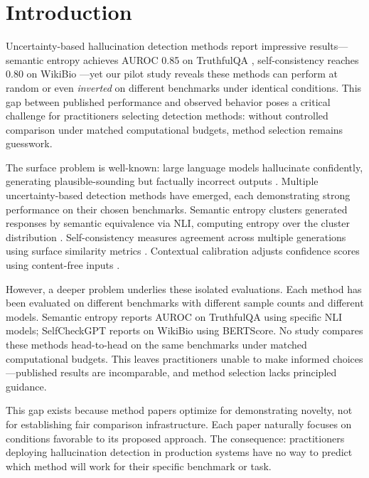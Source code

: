 \section{Introduction}
\label{sec:introduction}

Uncertainty-based hallucination detection methods report impressive results---semantic entropy achieves AUROC 0.85 on TruthfulQA \cite{kuhn2023semantic}, self-consistency reaches 0.80 on WikiBio \cite{manakul2023selfcheckgpt}---yet our pilot study reveals these methods can perform at random or even \emph{inverted} on different benchmarks under identical conditions. This gap between published performance and observed behavior poses a critical challenge for practitioners selecting detection methods: without controlled comparison under matched computational budgets, method selection remains guesswork.

The surface problem is well-known: large language models hallucinate confidently, generating plausible-sounding but factually incorrect outputs \cite{lin2022truthfulqa}. Multiple uncertainty-based detection methods have emerged, each demonstrating strong performance on their chosen benchmarks. Semantic entropy clusters generated responses by semantic equivalence via NLI, computing entropy over the cluster distribution \cite{kuhn2023semantic}. Self-consistency measures agreement across multiple generations using surface similarity metrics \cite{manakul2023selfcheckgpt}. Contextual calibration adjusts confidence scores using content-free inputs \cite{zhao2021calibrate}.

However, a deeper problem underlies these isolated evaluations. Each method has been evaluated on different benchmarks with different sample counts and different models. Semantic entropy reports AUROC on TruthfulQA using specific NLI models; SelfCheckGPT reports on WikiBio using BERTScore. No study compares these methods head-to-head on the same benchmarks under matched computational budgets. This leaves practitioners unable to make informed choices---published results are incomparable, and method selection lacks principled guidance.

This gap exists because method papers optimize for demonstrating novelty, not for establishing fair comparison infrastructure. Each paper naturally focuses on conditions favorable to its proposed approach. The consequence: practitioners deploying hallucination detection in production systems have no way to predict which method will work for their specific benchmark or task.

